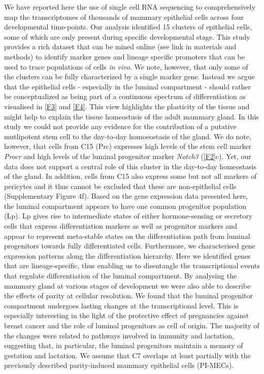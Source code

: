 \documentclass[titlepage, 12pt, oneside]{amsart}
\begin{document}
We have reported here the use of single cell RNA sequencing to comprehensively map the transcriptomes of thousands of mammary epithelial cells across four developmental time-points.
Our analysis identified 15 clusters of epithelial cells, some of which are only present during specific developmental stage.
This study provides a rich dataset that can be mined online (see link in materials and methods) to identify marker genes and lineage specific promoters that can be used to trace populations of cells \textit{in vivo}.
We note, however, that only some of the clusters can be fully characterized by a single marker gene.
Instead we argue that the epithelial cells - especially in the luminal compartment - should rather be conceptualized as being part of a continuous spectrum of differentiation as visualised in \autoref{F3} and \autoref{F4}.
This view highlights the plasticity of the tissue and might help to explain the tissue homeostasis of the adult mammary gland\autocite{Inman2015}.
In this study we could not provide any evidence for the contribution of a putative mutlipotent stem cell to the day-to-day homoeostasis of the gland.
We do note, however, that cells from C15 (Prc) expresses high levels of the stem cell marker \textit{Procr}\autocite{Wang2015} and high levels of the luminal progenitor marker \textit{Notch3}\autocite{Lafkas2013} (\autoref{F2}c).
Yet, our data does not support a central role of this cluster in the day-to-day homeostasis of the gland. 
In addition, cells from C15 also express some but not all markers of pericytes and it thus cannot be excluded that these are non-epithelial cells (Supplementary Figure 4f). 
Based on the gene expression data presented here, the luminal compartment appears to have one common progenitor population (Lp).
Lp gives rise to intermediate states of either hormone-sensing or secretory cells that express differentiation markers as well as progenitor markers and appear to represent meta-stable states on the differentiation path from luminal progenitors towards fully differentiated cells.
Furthermore, we characterised gene expression patterns along the differentiation hierarchy.
Here we identified genes that are lineage-specific, thus enabling us to disentangle the transcriptional events that regulate differentiation of the luminal compartment.
By analysing the mammary gland at various stages of development we were also able to describe the effects of parity at cellular resolution.
We found that the luminal progenitor compartment undergoes lasting changes at the transcriptional level.
This is especially interesting in the light of the protective effect of pregnancies against breast cancer and the role of luminal progenitors as cell of origin.
The majority of the changes were related to pathways involved in immunity and lactation, suggesting that, in particular, the luminal progenitors maintain a memory of gestation and lactation.
We assume that C7 overlaps at least partially with the previously described parity-induced mammary epithelial cells (PI-MECs)\autocite{Wagner2002}.
\end{document}
